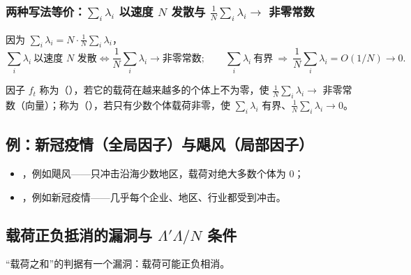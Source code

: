 \subsubsection{两种写法等价：\texorpdfstring{$\sum_i\lambda_i$}{sum lambda\_i} 以速度 \texorpdfstring{$N$}{N} 发散与 \texorpdfstring{$\frac1N\sum_i\lambda_i\to$}{(1/N) sum lambda\_i ->} 非零常数}

因为 $\sum_i\lambda_i=N\cdot\frac1N\sum_i\lambda_i$，
\[
\sum_i\lambda_i\ \text{以速度 $N$ 发散}\iff\frac1N\sum_i\lambda_i\to\text{非零常数};\qquad
\sum_i\lambda_i\ \text{有界}\ \Rightarrow\ \frac1N\sum_i\lambda_i=O(1/N)\to0 .
\]

\begin{defn}[强因子与弱因子]\label{def:U13a-sfwf}
因子 $f_t$ 称为（），若它的载荷在越来越多的个体上不为零，使 $\frac1N\sum_i\lambda_i\to$ 非零常数（向量）；称为（），若只有少数个体载荷非零，使 $\sum_i\lambda_i$ 有界、$\frac1N\sum_i\lambda_i\to0$。
\end{defn}

\subsection{例：新冠疫情（全局因子）与飓风（局部因子）}

\begin{itemize}
\item {}，例如飓风——只冲击沿海少数地区，载荷对绝大多数个体为 0；
\item {}，例如新冠疫情——几乎每个企业、地区、行业都受到冲击。
\end{itemize}

\subsection{载荷正负抵消的漏洞与 \texorpdfstring{$\Lambda'\Lambda/N$}{Lambda'Lambda/N} 条件}

“载荷之和”的判据有一个漏洞：载荷可能正负相消。

